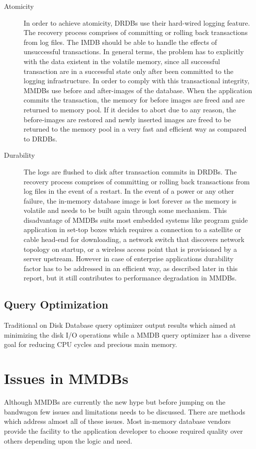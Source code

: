 \documentclass[10pt]{article} %
\begin{document}
\begin{description}
\item[Atomicity] In order to achieve atomicity, DRDBs use their hard-wired logging feature. The recovery process comprises of committing or rolling back transactions from log files. The IMDB should be able to handle the effects of unsuccessful transactions. In general terms, the problem has to explicitly with the data existent in the volatile memory, since all successful transaction are in a successful state only after been committed to the logging infrastructure. In order to comply with this transactional integrity, MMDBs use before and after-images of the database. When the application commits the transaction, the memory for before images are freed and are returned to memory pool. If it decides to abort due to any reason, the before-images are restored and newly inserted images are freed to be returned to the memory pool in a very fast and efficient way as compared to DRDBs.

\item[Durability] The logs are flushed to disk after transaction commits in DRDBs. The recovery process comprises of committing or rolling back transactions from log files in the event of a restart. In the event of a power or any other failure, the in-memory database image is lost forever as the memory is volatile and needs to be built again through some mechanism. This disadvantage of MMDBs suits most embedded systems like program guide application in set-top boxes which requires a connection to a satellite or cable head-end for downloading, a network switch that discovers network topology on startup, or a wireless access point that is provisioned by a server upstream. However in case of enterprise applications durability factor has to be addressed in an efficient way, as described later in this report, but it still contributes to performance degradation in MMDBs.
\end{description}

\subsection{Query Optimization}
Traditional on Disk Database query optimizer output results which aimed at minimizing the disk I/O operations while a MMDB query optimizer has a diverse goal for reducing CPU cycles and precious main memory. 

\section{Issues in MMDBs}
Although MMDBs are currently the new hype but before jumping on the bandwagon few issues and limitations needs to be discussed. There are methods which address almost all of these issues. Most in-memory database vendors provide the facility to the application developer to choose required quality over others depending upon the logic and need. 
\end{document}
